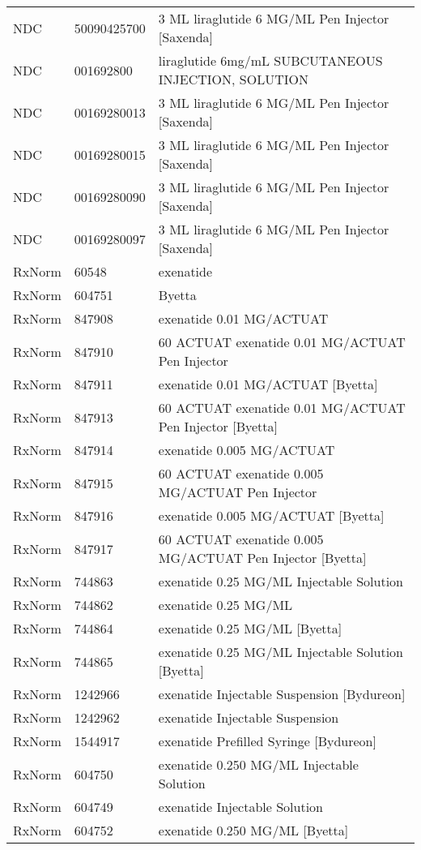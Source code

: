 \begin{longtable}{p{}p{}p{}}
  NDC & 50090425700 & 3 ML liraglutide 6 MG/ML Pen Injector [Saxenda] \\ 
  NDC & 001692800 & liraglutide 6mg/mL SUBCUTANEOUS INJECTION, SOLUTION \\ 
  NDC & 00169280013 & 3 ML liraglutide 6 MG/ML Pen Injector [Saxenda] \\ 
  NDC & 00169280015 & 3 ML liraglutide 6 MG/ML Pen Injector [Saxenda] \\ 
  NDC & 00169280090 & 3 ML liraglutide 6 MG/ML Pen Injector [Saxenda] \\ 
  NDC & 00169280097 & 3 ML liraglutide 6 MG/ML Pen Injector [Saxenda] \\ 
  RxNorm & 60548 & exenatide \\ 
  RxNorm & 604751 & Byetta \\ 
  RxNorm & 847908 & exenatide 0.01 MG/ACTUAT \\ 
  RxNorm & 847910 & 60 ACTUAT exenatide 0.01 MG/ACTUAT Pen Injector \\ 
  RxNorm & 847911 & exenatide 0.01 MG/ACTUAT [Byetta] \\ 
  RxNorm & 847913 & 60 ACTUAT exenatide 0.01 MG/ACTUAT Pen Injector [Byetta] \\ 
  RxNorm & 847914 & exenatide 0.005 MG/ACTUAT \\ 
  RxNorm & 847915 & 60 ACTUAT exenatide 0.005 MG/ACTUAT Pen Injector \\ 
  RxNorm & 847916 & exenatide 0.005 MG/ACTUAT [Byetta] \\ 
  RxNorm & 847917 & 60 ACTUAT exenatide 0.005 MG/ACTUAT Pen Injector [Byetta] \\ 
  RxNorm & 744863 & exenatide 0.25 MG/ML Injectable Solution \\ 
  RxNorm & 744862 & exenatide 0.25 MG/ML \\ 
  RxNorm & 744864 & exenatide 0.25 MG/ML [Byetta] \\ 
  RxNorm & 744865 & exenatide 0.25 MG/ML Injectable Solution [Byetta] \\ 
  RxNorm & 1242966 & exenatide Injectable Suspension [Bydureon] \\ 
  RxNorm & 1242962 & exenatide Injectable Suspension \\ 
  RxNorm & 1544917 & exenatide Prefilled Syringe [Bydureon] \\ 
  RxNorm & 604750 & exenatide 0.250 MG/ML Injectable Solution \\ 
  RxNorm & 604749 & exenatide Injectable Solution \\ 
  RxNorm & 604752 & exenatide 0.250 MG/ML [Byetta] \\ 

\end{longtable}
